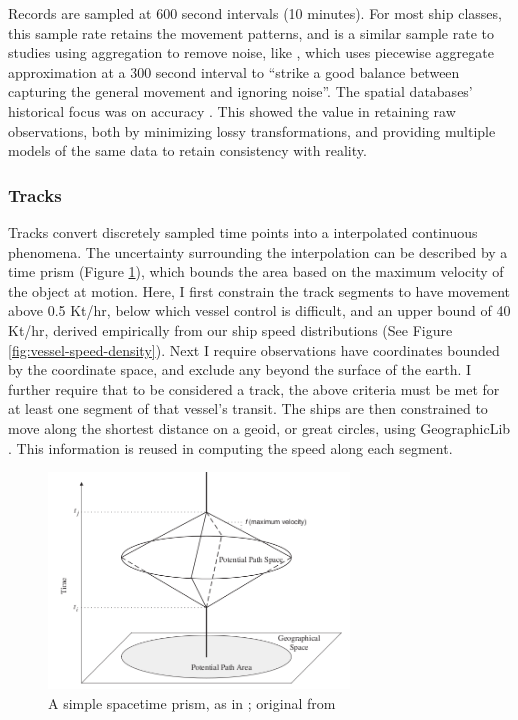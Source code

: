 Records are sampled at 600 second intervals (10 minutes). For most ship classes, this sample rate retains the movement patterns, and is a similar sample rate to studies using aggregation to remove noise, like \citep{Vries2009}, which uses piecewise aggregate approximation at a 300 second interval to ``strike a good balance between capturing the general movement and ignoring noise''. %
The spatial databases' historical focus was on accuracy \citep{goodchild1989accuracy}. This showed the value in retaining raw observations, both by minimizing lossy transformations, and providing multiple models of the same data to retain consistency with reality.

\subsubsection{Tracks}

Tracks convert discretely sampled time points into a interpolated continuous phenomena. The uncertainty surrounding the interpolation can be described by a time prism (Figure \ref{fig:time-prism}), which bounds the area based on the maximum velocity of the object at motion. Here, I first constrain the track segments to have movement above 0.5 Kt/hr, below which vessel control is difficult, and an upper bound of 40 Kt/hr, derived empirically from our ship speed distributions (See Figure \ref{fig:vessel-speed-density}). Next I require observations have coordinates bounded by the coordinate space, and exclude %
any beyond the surface of the earth. I further require that to be considered a track, the above criteria must be met for at least one segment of that vessel's transit. The ships are then constrained to move along the shortest distance on a geoid, or great circles, using GeographicLib \citep{karney2012algorithms}. This information is reused in computing the speed along each segment. %

\begin{figure}[h!]
  \centering
    \includegraphics[width=80mm]{images/measurement-theory-for-time-geography-prism.png}
  \caption {A simple space{\textendash}time prism, as in \citep{Miller2005}; original from \citep{Wu2002}}
  \label{fig:time-prism}
\end{figure}

